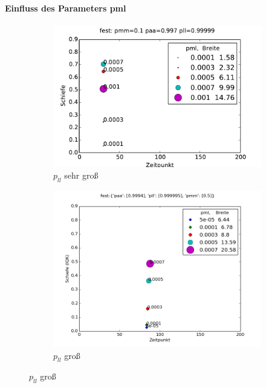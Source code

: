 \paragraph*{Einfluss des Parameters pml}

\begin{figure}
\begin{subfigure}[t]{0.5\textwidth}
\includegraphics[width=\textwidth]{bilder/pml/pml_01_p_0997_099999}
\caption{$p_{ll}$ sehr groß}
\label{einfluss_pml_pll++}
\end{subfigure}
\begin{subfigure}[t]{0.5\textwidth}
\includegraphics[width=\textwidth]{bilder/pml/pml_05_p_09994_0999995}
\caption{$p_{ll}$ groß}
\label{einfluss_pml_pll+}
\end{subfigure}
\vspace*{7mm}

\end{figure}
